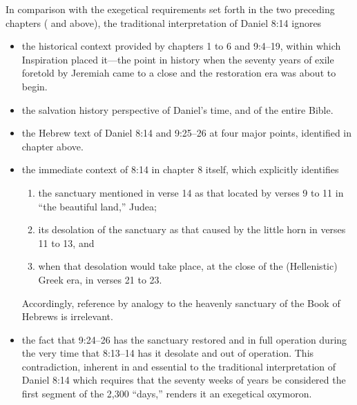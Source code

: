 In comparison with the exegetical requirements set forth in the two
preceding chapters ( and  above), the 
traditional interpretation of Daniel 8:14 ignores
\begin{itemize}
	\item the historical context provided by chapters 1 to 6 and 9:4--19, within
which Inspiration placed it---the point in history when the seventy years of
exile foretold by Jeremiah came to a close and the restoration era was
about to begin.
	\item the salvation history perspective of Daniel's time, and of the entire
Bible.
	\item the Hebrew text of Daniel 8:14 and 9:25--26 at four major points,
identified in chapter  above.
	\item the immediate context of 8:14 in chapter 8 itself, which explicitly
identifies
	\begin{enumerate}
		\item the sanctuary mentioned in verse 14 as that located by verses
9 to 11 in ``the beautiful land,'' Judea; 
		\item its desolation of the sanctuary
as that caused by the little horn in verses 11 to 13, and 
		\item when that
desolation would take place, at the close of the (Hellenistic) Greek era, in
verses 21 to 23.
	\end{enumerate}
	Accordingly, reference by analogy to the heavenly sanctuary
	of the Book of Hebrews is irrelevant.

	\item the fact that 9:24--26 has the sanctuary restored and in full operation
during the very time that 8:13--14 has it desolate and out of operation. This
contradiction, inherent in and essential to the traditional interpretation
of Daniel 8:14 which requires that the seventy weeks of years be considered
the first segment of the 2,300 ``days,'' renders it an exegetical oxymoron.
\end{itemize}

